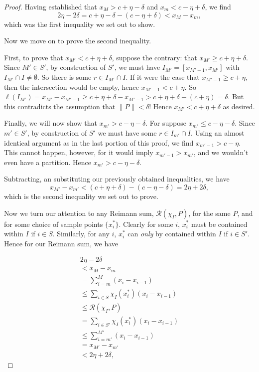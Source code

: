 \documentclass[12pt, letterpaper]{article}
\newcommand\norm[1]{\lVert#1\rVert} %
\newcommand\rsum[2]{\mathcal{R} (#1,#2)} %
\theoremstyle{definition}
\begin{document}
\begin{proof}
        Having established that $ x_M> c + \eta - \delta $ and $x_m < c - \eta + \delta $, we find \[2\eta - 2\delta = c + \eta - \delta - (c - \eta + \delta) < x_M - x_m, \]
        which was the first inequality we set out to show. 

        Now we move on to prove the second inequality.

        First, to prove that $x_{M'} < c + \eta + \delta$, suppose the contrary: that $x_{M'} \ge c + \eta + \delta$. Since $M'\in S'$, by construction of $S'$, we must have $I_{M'} = [x_{M'-1} , x_{M'}]$ with $ I_{M'}\cap I \ne \emptyset $. So there is some $r\in I_{M'}\cap I$. If it were the case that $ x_{M'-1} \ge c + \eta $, then the intersection would be empty, hence $ x_{M' - 1} < c + \eta $. So $\ell(I_{M'}) = x_{M'} - x_{M' - 1} \ge c + \eta + \delta - x_{M' - 1} > c + \eta + \delta - (c + \eta) = \delta$. But this contradicts the assumption that $\norm{P} < \delta$! Hence $ x_{M'} < c + \eta + \delta $ as desired. 

        Finally, we will now show that $x_{m'} > c - \eta - \delta$. For suppose $x_{m'} \le c - \eta - \delta$. Since $m'\in S'$, by construction of $S'$ we must have some $ r\in I_{m'}\cap I $. Using an almost identical argument as in the last portion of this proof, we find $ x_{m'- 1} > c - \eta $. This cannot happen, however, for it would imply $x_{m'- 1} > x_{m'}$, and we wouldn't even have a partition. Hence $x_{m'} > c - \eta - \delta$. 

        Subtracting, an substituting our previously obtained inequalities, we have 
        \[
            x_{M'} - x_{m'} < (c + \eta + \delta) - (c - \eta - \delta) = 2\eta + 2\delta,
            \]
            which is the second inequality we set out to prove.

        Now we turn our attention to any Reimann sum, $\rsum{\chi_I}{P}$, for the same $P$, and for some choice of sample points $\{x_i^*\}$. Clearly for some $i$, $x_i^*$ must be contained within $I$ if $i\in S$. Similarly, for any $i$, $x_i^*$ can \textit{only} by contained within $I$ if $i\in S'$. Hence for our Reimann sum, we have

        \begin{equation}
            \begin{split}
                2\eta - 2\delta \\
             < x_M - x_m\\
             = \sum_{i = m}^{M}(x_i - x_{i - 1})\\
             \le \sum_{i\in S}\chi_I(x_i^*)(x_i - x_{i-1}) \\
             \le \rsum{\chi_I}{P}  \\
             = \sum_{i \in S'}\chi_I(x_i^*)(x_i - x_{i -1}) \\
             \le \sum_{i = m'}^{M'}(x_i - x_{i - 1}) \\
             = x_{M'} - x_{m'}\\
             < 2\eta + 2\delta,
            \end{split}
        \end{equation}


\end{proof}
\end{document}

